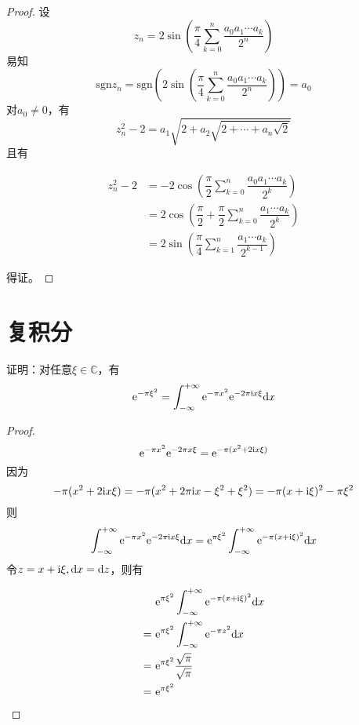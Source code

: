 \begin{proof}

    设
    $$z_n = 2 \sin{\left(\dfrac{\pi}{4} \sum\limits_{k = 0}^{n}{\dfrac{a_0 a_1 \cdots a_k}{2^n}}\right)}$$
    易知
    $$\mathrm{sgn}{z_n} = \mathrm{sgn}\left(2 \sin{\left(\dfrac{\pi}{4} \sum\limits_{k = 0}^{n}{\dfrac{a_0 a_1 \cdots a_k}{2^n}}\right)}\right) = a_0$$
    对$a_0 \neq 0$，有
    $$z_n^2 - 2 = a_1\sqrt{2 + a_2\sqrt{2 + \cdots + a_n\sqrt{2}}}$$
    且有

    \begin{align*}
        z_n^2 - 2 & = -2 \cos{\left(\dfrac{\pi}{2}\sum\limits_{k = 0}^{n}{\dfrac{a_0 a_1 \cdots a_k}{2^k}}\right)} \\
        & = 2 \cos{\left(\dfrac{\pi}{2} + \dfrac{\pi}{2}\sum\limits_{k = 0}^{n}{\dfrac{a_1 \cdots a_k}{2^k}}\right)} \\
        & = 2 \sin{\left(\dfrac{\pi}{4}\sum\limits_{k = 1}^{n}{\dfrac{a_1 \cdots a_k}{2^{k - 1}}}\right)}
    \end{align*}

    得证。

\end{proof}

\section{复积分}

\begin{proposition}

    证明：对任意$ \xi \in \mathbb{C}$，有
    $$\mathrm{e}^{-\pi\xi^2} = \int_{-\infty}^{+\infty}{\mathrm{e}^{-\pi x^2}\mathrm{e}^{-2\pi \mathrm{i} x\xi}}\mathrm{d} x$$
    
\end{proposition}

\begin{proof}

    $$\mathrm{e}^{-\pi x^2}\mathrm{e}^{-2\pi x\xi} = \mathrm{e}^{-\pi(x^2 + 2\mathrm{i} x\xi)}$$
    因为
    $$-\pi(x^2 + 2\mathrm{i} x\xi) = -\pi (x^2 + 2\pi\mathrm{i} x - \xi^2 + \xi^2) = -\pi(x + \mathrm{i} \xi)^2 - \pi\xi^2$$
    则
    $$\int_{-\infty}^{+\infty}{\mathrm{e}^{-\pi x^2}\mathrm{e}^{-2\pi \mathrm{i} x\xi}}\mathrm{d} x = \mathrm{e}^{\pi\xi^2} \int_{-\infty}^{+\infty}{\mathrm{e}^{-\pi (x+\mathrm{i}\xi)^2}}\mathrm{d} x$$
    令$z = x + \mathrm{i}\xi, \mathrm{d} x = \mathrm{d} z$，则有

    \begin{align*}
        &\mathrm{e}^{\pi\xi^2} \int_{-\infty}^{+\infty}{\mathrm{e}^{-\pi (x+\mathrm{i}\xi)^2}}\mathrm{d} x \\
        = \ & \mathrm{e}^{\pi\xi^2} \int_{-\infty}^{+\infty}{\mathrm{e}^{-\pi z^2}}\mathrm{d} x \\
        = \ & \mathrm{e}^{\pi\xi^2} \dfrac{\sqrt{\pi}}{\sqrt{\pi}} \\
        = \ & \mathrm{e}^{\pi\xi^2}
    \end{align*}

\end{proof}

